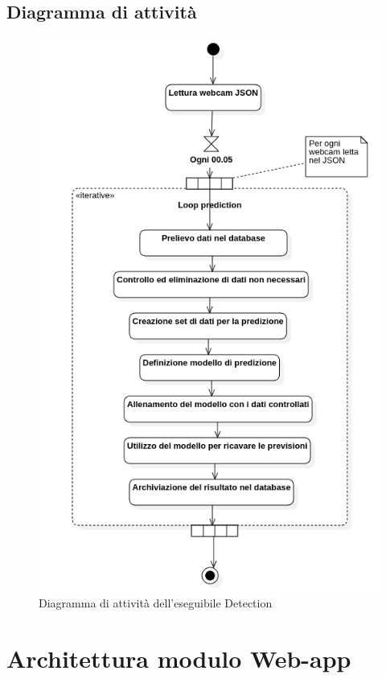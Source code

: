 \subsection{Diagramma di attività}
\begin{figure}[!h]
  \begin{center}
    \includegraphics[width=1\linewidth]{../immagini/diag_PB/prediction_activity.png}
    \caption{Diagramma di attività dell'eseguibile Detection}
  \end{center}
\end{figure}



\section{Architettura modulo Web-app}
